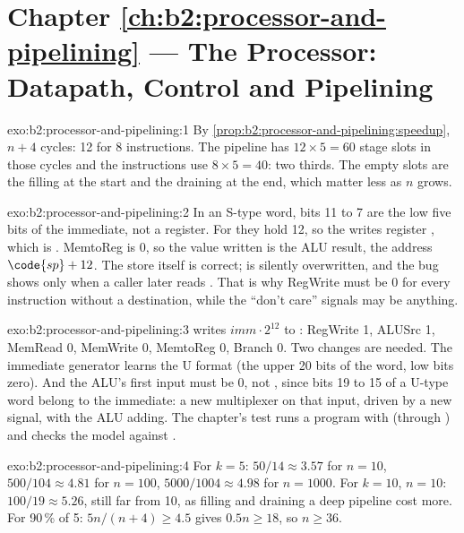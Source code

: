 \section*{Chapter \ref{ch:b2:processor-and-pipelining} --- The Processor: Datapath, Control and Pipelining}

\begin{solution}{exo:b2:processor-and-pipelining:1}
By \cref{prop:b2:processor-and-pipelining:speedup}, $n + 4$ cycles: 12 for 8 instructions. The pipeline has
$12 \times 5 = 60$ stage slots in those cycles and the instructions use $8 \times 5 = 40$: two thirds. The empty
slots are the filling at the start and the draining at the end, which matter less as $n$ grows.
\end{solution}

\begin{solution}{exo:b2:processor-and-pipelining:2}
In an S-type word, bits 11 to 7 are the low five bits of the immediate, not a register. For 
they hold 12, so the  writes register , which is . MemtoReg is 0, so the value
written is the ALU result, the address $\code{sp} + 12$. The store itself is correct;  is silently
overwritten, and the bug shows only when a caller later reads . That is why RegWrite must be 0 for every
instruction without a destination, while the ``don't care'' signals may be anything.
\end{solution}

\begin{solution}{exo:b2:processor-and-pipelining:3}
 writes $\mathit{imm} \cdot 2^{12}$ to : RegWrite 1, ALUSrc 1, MemRead 0, MemWrite 0,
MemtoReg 0, Branch 0. Two changes are needed. The immediate generator learns the U format (the upper 20 bits of the
word, low bits zero). And the ALU's first input must be 0, not , since bits 19 to 15 of a U-type word
belong to the immediate: a new multiplexer on that input, driven by a new signal, with the ALU adding.
The chapter's test runs a program with  (through ) and checks the model against .
\end{solution}

\begin{solution}{exo:b2:processor-and-pipelining:4}
For $k = 5$: $50/14 \approx 3.57$ for $n = 10$, $500/104 \approx 4.81$ for $n = 100$, $5000/1004 \approx 4.98$ for
$n = 1000$. For $k = 10$, $n = 10$: $100/19 \approx 5.26$, still far from 10, as filling and draining a deep pipeline
cost more. For 90\,\% of 5: $5n/(n + 4) \ge 4.5$ gives $0.5n \ge 18$, so $n \ge 36$.
\end{solution}

